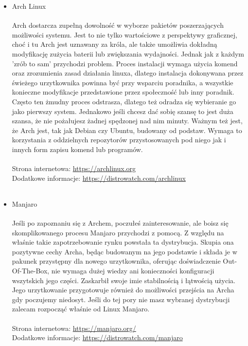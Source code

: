 \documentclass[10pt,a4paper]{report}
\begin{document}
\begin{itemize}
\item {\Huge Arch Linux \\\\}Arch dostarcza zupełną dowolność w wyborze pakietów poszerzających możliwości systemu. Jest to nie tylko wartościowe z perspektywy graficznej, choć i tu Arch jest uznawany za króla, ale także umożliwia dokładną modyfikację zużycia baterii lub zwiększania wydajności. Jednak jak z każdym 'zrób to sam' przychodzi problem. Proces instalacji wymaga użycia komend oraz zrozumienia zasad działania linuxa, dlatego instalacja dokonywana przez świeżego urzytkownika powinna być przy wsparciu poradnika, a wszystkie konieczne modyfikacje przedstawione przez społeczność lub inny poradnik. Często ten żmudny proces odstrasza, dlatego też odradza się wybieranie go jako pierwszy system. Jednakowo jeśli chcesz dać sobię szansę to jest duża szansa, że nie pożałujesz żadnej spędzonej nad nim minuty. Ważnym też jest, że Arch jest, tak jak Debian czy Ubuntu, budowany od podstaw. Wymaga to korzystania z oddzielnych repozytorów przystosowanych pod niego jak i innych form zapisu komend lub programów. \\\\Strona internetowa: \url{https://archlinux.org}\\ Dodatkowe informacje: \href{https://distrowatch.com/table.php?distribution=arch}{https://distrowatch.com/archlinux}\\\\
\item {\Huge Manjaro \\\\} Jeśli po zapoznaniu się z Archem, poczułeś zainteresowanie, ale boisz się skomplikowanego procesu Manjaro przychodzi z pomocą. Z względu na właśnie takie zapotrzebowanie rynku powstała ta dystrybucja. Skupia ona pozytywne cechy Archa, będąc budowanym na jego podstawie i składa je w pakunek przystępny dla nowego urzytkownika, oferując doświadczenie Out-Of-The-Box, nie wymaga dużej wiedzy ani konieczności konfiguracji wszytskich jego części. Zaskarbił swoje imie stabilnością i łątwością użycia. Jego urzytkowanie przygotowuje również do możliwości przejścia na Archa gdy poczujemy niedosyt. Jeśli do tej pory nie masz wybranej dystrybucji zalecam rozpocząć właśnie od Linux Manjaro.\\\\Strona internetowa: \url{https://manjaro.org/}\\ Dodatkowe informacje: \href{https://distrowatch.com/table.php?distribution=manjaro}{https://distrowatch.com/manjaro}\\

\end{itemize}
\end{document}
